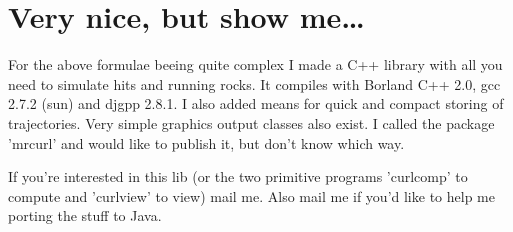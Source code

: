 

\chapter{Very nice, but show me\dots}

For the above formulae beeing quite complex I made a C++ library with all you
need to simulate hits and running rocks. It compiles with Borland C++ 2.0, gcc
2.7.2 (sun) and djgpp 2.8.1. I also added means for quick and compact storing
of trajectories. Very simple graphics output classes also exist. I called the
package 'mrcurl' and would like to publish it, but don't know which way.

If you're interested in this lib (or the two primitive programs 'curlcomp' to
compute and 'curlview' to view) mail me. Also mail me if you'd like to help me
porting the stuff to Java.
